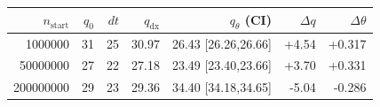 \begin{tabular}{r r r r r r r}
\hline
$n_{\mathrm{start}}$ & $q_0$ & $dt$ & $q_{\mathrm{dx}}$ & $q_{\theta}$ (CI) & $\Delta q$ & $\Delta\theta$ \\
\hline
1000000 & 31 & 25 & 30.97 & 26.43 [26.26,26.66] & +4.54 & +0.317 \\
50000000 & 27 & 22 & 27.18 & 23.49 [23.40,23.66] & +3.70 & +0.331 \\
200000000 & 29 & 23 & 29.36 & 34.40 [34.18,34.65] & -5.04 & -0.286 \\
\hline
\end{tabular}
